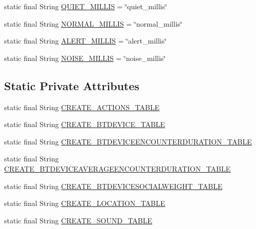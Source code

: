 \begin{DoxyCompactItemize}
\item 
static final String \hyperlink{classcs_1_1nsense_1_1db_1_1_n_sense_s_q_lite_helper_aca4c16641d87e464e37b4649a2b643fe}{Q\-U\-I\-E\-T\-\_\-\-M\-I\-L\-L\-I\-S} = \char`\"{}quiet\-\_\-millis\char`\"{}
\item 
static final String \hyperlink{classcs_1_1nsense_1_1db_1_1_n_sense_s_q_lite_helper_a40a1401dfe12d12ab47792eb901d7783}{N\-O\-R\-M\-A\-L\-\_\-\-M\-I\-L\-L\-I\-S} = \char`\"{}normal\-\_\-millis\char`\"{}
\item 
static final String \hyperlink{classcs_1_1nsense_1_1db_1_1_n_sense_s_q_lite_helper_ab8fbad09e9e02a101ab3ba52048933d3}{A\-L\-E\-R\-T\-\_\-\-M\-I\-L\-L\-I\-S} = \char`\"{}alert\-\_\-millis\char`\"{}
\item 
static final String \hyperlink{classcs_1_1nsense_1_1db_1_1_n_sense_s_q_lite_helper_a5c96f0a16dc1dd2bfa9163f1eb409faf}{N\-O\-I\-S\-E\-\_\-\-M\-I\-L\-L\-I\-S} = \char`\"{}noise\-\_\-millis\char`\"{}
\end{DoxyCompactItemize}
\subsection*{Static Private Attributes}
\begin{DoxyCompactItemize}
\item 
static final String \hyperlink{classcs_1_1nsense_1_1db_1_1_n_sense_s_q_lite_helper_aedf992886bbf3b5842f6417426c7d37e}{C\-R\-E\-A\-T\-E\-\_\-\-A\-C\-T\-I\-O\-N\-S\-\_\-\-T\-A\-B\-L\-E}
\item 
static final String \hyperlink{classcs_1_1nsense_1_1db_1_1_n_sense_s_q_lite_helper_a0327a832a45bc2c75ba4a833d1385001}{C\-R\-E\-A\-T\-E\-\_\-\-B\-T\-D\-E\-V\-I\-C\-E\-\_\-\-T\-A\-B\-L\-E}
\item 
static final String \hyperlink{classcs_1_1nsense_1_1db_1_1_n_sense_s_q_lite_helper_a1c93b8df977b971ffdaca66c2f0a197b}{C\-R\-E\-A\-T\-E\-\_\-\-B\-T\-D\-E\-V\-I\-C\-E\-E\-N\-C\-O\-U\-N\-T\-E\-R\-D\-U\-R\-A\-T\-I\-O\-N\-\_\-\-T\-A\-B\-L\-E}
\item 
static final String \hyperlink{classcs_1_1nsense_1_1db_1_1_n_sense_s_q_lite_helper_af71c2d7389ac67a81d69aaaba0befad1}{C\-R\-E\-A\-T\-E\-\_\-\-B\-T\-D\-E\-V\-I\-C\-E\-A\-V\-E\-R\-A\-G\-E\-E\-N\-C\-O\-U\-N\-T\-E\-R\-D\-U\-R\-A\-T\-I\-O\-N\-\_\-\-T\-A\-B\-L\-E}
\item 
static final String \hyperlink{classcs_1_1nsense_1_1db_1_1_n_sense_s_q_lite_helper_af7ef650e413578f3c90b4b47fe299cd8}{C\-R\-E\-A\-T\-E\-\_\-\-B\-T\-D\-E\-V\-I\-C\-E\-S\-O\-C\-I\-A\-L\-W\-E\-I\-G\-H\-T\-\_\-\-T\-A\-B\-L\-E}
\item 
static final String \hyperlink{classcs_1_1nsense_1_1db_1_1_n_sense_s_q_lite_helper_ae9ea9679888a8bd8630020c81d3c9394}{C\-R\-E\-A\-T\-E\-\_\-\-L\-O\-C\-A\-T\-I\-O\-N\-\_\-\-T\-A\-B\-L\-E}
\item 
static final String \hyperlink{classcs_1_1nsense_1_1db_1_1_n_sense_s_q_lite_helper_a81496624d25ba2f93b08ca60d576cdb7}{C\-R\-E\-A\-T\-E\-\_\-\-S\-O\-U\-N\-D\-\_\-\-T\-A\-B\-L\-E}
\end{DoxyCompactItemize}



